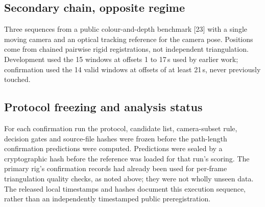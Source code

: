 \documentclass{iopjournal}
\begin{document}
\subsection{Secondary chain, opposite regime}
Three sequences from a public colour-and-depth benchmark [23] with a single
moving camera and an optical tracking reference for the camera pose. Positions
come from chained pairwise rigid registrations, not independent triangulation.
Development used the 15 windows at offsets 1 to 17\,s used by earlier work;
confirmation used the 14 valid windows at offsets of at least 21\,s, never
previously touched.

\subsection{Protocol freezing and analysis status}
For each confirmation run the protocol, candidate list, camera-subset rule,
decision gates and source-file hashes were frozen before the path-length
confirmation predictions were computed. Predictions were sealed by a
cryptographic hash before the reference was loaded for that run's scoring.
The primary rig's confirmation records had already been used for per-frame
triangulation quality checks, as noted above; they were not wholly unseen
data. The released local timestamps and hashes document this execution
sequence, rather than an independently timestamped public preregistration.
\end{document}
